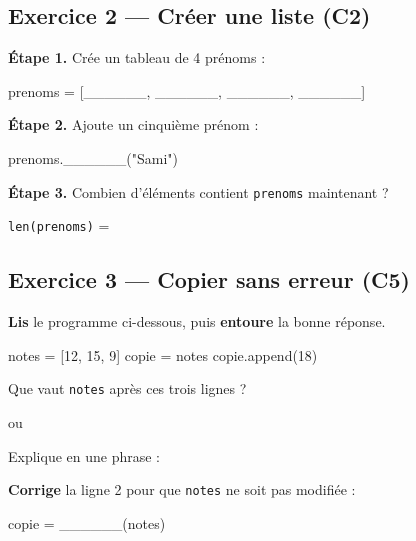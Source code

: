 \bigskip
\bigskip

\subsection*{Exercice 2 --- Créer une liste (C2)}

\textbf{Étape 1.} Crée un tableau de 4 prénoms :

\begin{python}
prenoms = [______, ______, ______, ______]
\end{python}

\textbf{Étape 2.} Ajoute un cinquième prénom :

\begin{python}
prenoms.______("Sami")
\end{python}

\textbf{Étape 3.} Combien d'éléments contient \lstinline{prenoms} maintenant ?

\medskip
\lstinline{len(prenoms)} = \dotfill

\bigskip
\bigskip

\subsection*{Exercice 3 --- Copier sans erreur (C5)}

\textbf{Lis} le programme ci-dessous, puis \textbf{entoure} la bonne réponse.

\begin{python}
notes = [12, 15, 9]
copie = notes
copie.append(18)
\end{python}

\bigskip

Que vaut \lstinline{notes} après ces trois lignes ?

\bigskip

\begin{center}
\fbox{\lstinline{[12, 15, 9]}} \qquad ou \qquad
\fbox{\lstinline{[12, 15, 9, 18]}}
\end{center}

\bigskip

Explique en une phrase : \dotfill

\medskip
\dotfill

\bigskip

\textbf{Corrige} la ligne 2 pour que \lstinline{notes} ne soit pas modifiée :

\begin{python}
copie = ______(notes)
\end{python}
